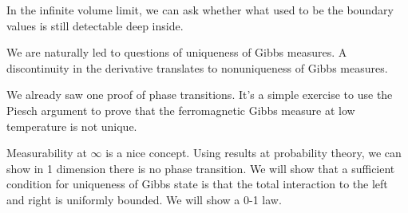 \documentclass[12pt]{book}
\theoremstyle{norm}
\begin{document}
In the infinite volume limit, we can ask whether what used to be the boundary values is still detectable deep inside.

We are naturally led to questions of uniqueness of Gibbs measures. A discontinuity in the derivative translates to nonuniqueness of Gibbs measures.

We already saw one proof of phase transitions. It's a simple exercise to use the Piesch argument to prove that the ferromagnetic Gibbs measure at low temperature is not unique.

Measurability at $\infty$ is a nice concept. Using results at probability theory, we can show in 1 dimension there is no phase transition. We will show that a sufficient condition for uniqueness of Gibbs state is that the total interaction to the left and right is uniformly bounded. We will show a 0-1 law.





%

%
%

\printnomenclature
\printindex
\end{document}
